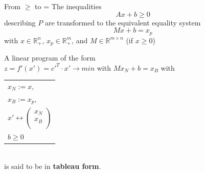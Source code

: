 \documentclass[10pt]{beamer}
\begin{document}
\begin{frame}{From $\geq$ to =}
	The inequalities 
	\begin{equation*}
		Ax + b \geq 0
	\end{equation*}
	describing $P$ are transformed to the equivalent equality system
	\begin{equation*}
		Mx + b = x_p
	\end{equation*}
	with $x\in \mathbb{R}_+^n$, $ x_p \in \mathbb{R}_+^m$, and $M\in \mathbb{R}^{m\times n}$ (if $x\geq 0$)\\
	\pause
	\begin{definition}
		A linear program of the form \\
		\vspace{0.25cm}
		$ z = f'(x') = c'^T \cdot x' \rightarrow min$ 
		\hspace{0.5cm} with $Mx_N+b=x_B$ with \begin{tabular}{l}
			$x_N:=x,$ \\
			$x_B:=x_p,$\\ $x'\leftrightarrow\begin{pmatrix}
			x_N\\x_B\\
			\end{pmatrix} $\\
			$b\geq 0$
		\end{tabular}  \\
		\vspace{0.15cm}
		is said to be in \textbf{tableau form}.\\
	\end{definition}
\end{frame}
\end{document}
